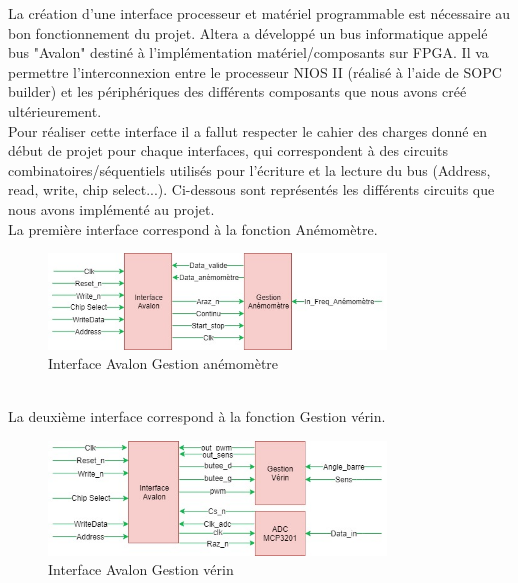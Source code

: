 La création d'une interface processeur et matériel programmable est nécessaire au bon fonctionnement du projet. Altera a développé un bus informatique appelé bus "Avalon" destiné à l'implémentation matériel/composants sur FPGA. Il va permettre l'interconnexion entre le processeur NIOS II (réalisé à l'aide de SOPC builder) et les périphériques des différents composants que nous avons créé ultérieurement.\\
\newline
Pour réaliser cette interface il a fallut respecter le cahier des charges donné en début de projet pour chaque interfaces, qui correspondent à des circuits combinatoires/séquentiels utilisés pour l'écriture et la lecture du bus (Address, read, write, chip select...). Ci-dessous sont représentés les différents circuits que nous avons implémenté au projet.\\
\newline
La première interface correspond à la fonction Anémomètre.
\begin{figure}[h]
  \begin{center}
    \includegraphics[width=0.8\textwidth]{images/avalon_anemo.jpg}
    \caption{Interface Avalon Gestion anémomètre}
  \end{center}
\end{figure}\\
\newline
La deuxième interface correspond à la fonction Gestion vérin.

\begin{figure}[h]
  \begin{center}
    \includegraphics[width=0.8\textwidth]{images/avalon_verin.jpg}
    \caption{Interface Avalon Gestion vérin}
  \end{center}
\end{figure}